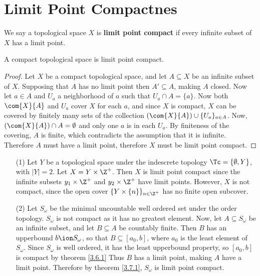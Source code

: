 \section{Limit Point Compactnes}

\begin{definition}
    We say a topological space $X$ is \textbf{limit point compact} if every
    infinite subset of $X$ has a limit point.
\end{definition}

\begin{theorem}\label{3.7.1}
    A compact topological space is limit point compact.
\end{theorem}
\begin{proof}
    Let $X$ be a compact topological space, and let  $A \subseteq X$ be an
    infinite subset of  $X$. Supposing that  $A$ has no limit point then  $A'
    \subseteq A$, making  $A$ closed. Now let  $a \in A$ and  $U_a$ a
    neighborhood of  $a$ such that $U_a \cap A=\{a\}$. Now both $\com{X}{A}$ and
    $U_a$ cover  $X$ for each $a$, and since  $X$ is compact, $X$ can be covered
    by finitely many sets of the collection  $(\com{X}{A}) \cup \{U_a\}_{a \in
    A}$. Now, $(\com{X}{A}) \cap A=\emptyset$ and only one $a$ is in each $U_a$.
    By finiteness of the covering, $A$ is finite, which contradicts the
    assumption that it is infinite. Therefore $A$ must have a limit point,
    therefore  $X$ must be limit point compact.
\end{proof}

\begin{example}\label{3.11}
    \begin{enumerate}
        \item[(1)] Let $Y$ be a topological space under the indescrete topology
             $\Tc=\{\emptyset, Y\}$, with $|Y|=2$. Let  $X=Y \times \Z^+$. Then
              $X$ is limit point compact since the infinite subsets  $y_1 \times
              \Z^+$ and  $y_2 \times \Z^+$ have limit points. However, $X$ is
              not compact, since the open cover  $\{Y \times \{n\}\}_{n \in \Z^+}$
              has no finite open subcover.

          \item[(2)] Let $S_\omega$ be the minimal uncountable well ordered set
              under the order topology.  $S_\omega$ is not compact as it has no
              greatest element. Now, let  $A \subseteq S_\omega$ be an infinite
              subset, and let  $B \subseteq A$ be countably finite. Then  $B$
              has an upperbound  $b \ion S_\omega$, so that  $B \subseteq
              [a_0,b]$, where $a_0$ is the least element of $S_\omega$. Since
              $S_\omega$ is well ordered, it has the least upperbound property,
              so  $[a_0,b]$ is compact by theorem \ref{3.6.1} Thus $B$ has a
              limit point, making  $A$ have a limit point. Therefore by theorem
               \ref{3.7.1}, $S_\omega$ is limit point compact.
    \end{enumerate}
\end{example}

